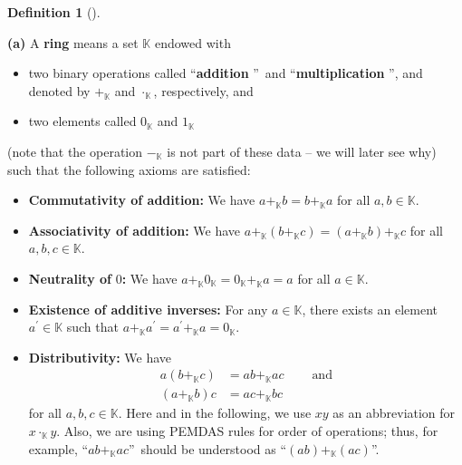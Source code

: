 \documentclass[numbers=enddot,12pt,final,onecolumn,notitlepage]{scrartcl}%
\numberwithin{exer}{subsection}
\theoremstyle{definition}
\newtheorem{defi}[theo]{Definition}
\newenvironment{definition}[1][]
{\begin{defi}[#1]\begin{leftbar}}
{\end{leftbar}\end{defi}}
\begin{document}
\begin{definition}
\textbf{(a)} A\textbf{ ring} means a set $\mathbb{K}$ endowed with

\begin{itemize}
\item two binary operations called \textquotedblleft\textbf{addition}%
\textquotedblright\ and \textquotedblleft\textbf{multiplication}%
\textquotedblright, and denoted by $+_{\mathbb{K}}$ and $\cdot_{\mathbb{K}}$,
respectively, and

\item two elements called $0_{\mathbb{K}}$ and $1_{\mathbb{K}}$
\end{itemize}

(note that the operation $-_{\mathbb{K}}$ is not part of these data -- we will
later see why) such that the following axioms are satisfied:

\begin{itemize}
\item \textbf{Commutativity of addition:} We have $a+_{\mathbb{K}%
}b=b+_{\mathbb{K}}a$ for all $a,b\in\mathbb{K}$.

\item \textbf{Associativity of addition:} We have $a+_{\mathbb{K}}\left(
b+_{\mathbb{K}}c\right)  =\left(  a+_{\mathbb{K}}b\right)  +_{\mathbb{K}}c$
for all $a,b,c\in\mathbb{K}$.

\item \textbf{Neutrality of }$0$\textbf{:} We have $a+_{\mathbb{K}%
}0_{\mathbb{K}}=0_{\mathbb{K}}+_{\mathbb{K}}a=a$ for all $a\in\mathbb{K}$.

\item \textbf{Existence of additive inverses:} For any $a\in\mathbb{K}$, there
exists an element $a^{\prime}\in\mathbb{K}$ such that $a+_{\mathbb{K}%
}a^{\prime}=a^{\prime}+_{\mathbb{K}}a=0_{\mathbb{K}}$.

\item \textbf{Distributivity:} We have%
\begin{align*}
a\left(  b+_{\mathbb{K}}c\right)    & =ab+_{\mathbb{K}}%
ac\ \ \ \ \ \ \ \ \ \ \text{and}\\
\left(  a+_{\mathbb{K}}b\right)  c  & =ac+_{\mathbb{K}}bc
\end{align*}
for all $a,b,c\in\mathbb{K}$. Here and in the following, we use $xy$ as an
abbreviation for $x\cdot_{\mathbb{K}}y$. Also, we are using PEMDAS rules for
order of operations; thus, for example, \textquotedblleft$ab+_{\mathbb{K}}%
ac$\textquotedblright\ should be understood as \textquotedblleft$\left(
ab\right)  +_{\mathbb{K}}\left(  ac\right)  $\textquotedblright.


\end{itemize}
\end{definition}
\end{document}
